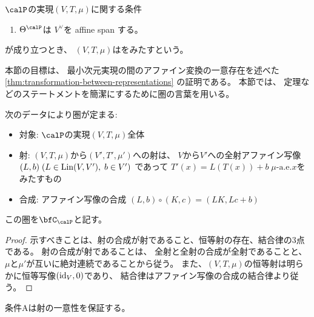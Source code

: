 \documentclass[report]{jlreq}
\begin{document}
\begin{definition}[条件B]
    $\calP$の実現$(V, T, \mu)$に関する条件
    \begin{enumerate}
        \item $\Theta^\calP$は
            $V^\vee$を affine span する。
    \end{enumerate}
    が成り立つとき、
    $(V, T, \mu)$はをみたすという。
\end{definition}

本節の目標は、
最小次元実現の間のアファイン変換の一意存在を述べた
\cref{thm:transformation-between-representations}
の証明である。
本節では、
定理などのステートメントを簡潔にするために圏の言葉を用いる。

\begin{propdef}
    次のデータにより圏が定まる:
    \begin{itemize}
        \item 対象: $\calP$の実現$(V, T, \mu)$全体
        \item 射: $(V, T, \mu)$から$(V', T', \mu')$への射は、
            $V$から$V'$への全射アファイン写像
            $(L, b) \; (L \in \operatorname{Lin}(V, V'), \; b \in V')$
            であって
            $T'(x) = L(T(x)) + b \; \text{$\mu$-a.e.$x$}$をみたすもの
        \item 合成: アファイン写像の合成
            $(L, b) \circ (K, c) = (LK, Lc + b)$
    \end{itemize}
    この圏を$\bfC_\calP$と記す。
\end{propdef}

\begin{proof}
    示すべきことは、射の合成が射であること、恒等射の存在、結合律の3点である。
    射の合成が射であることは、
    全射と全射の合成が全射であることと、
    $\mu$と$\mu'$が互いに絶対連続であることから従う。
    また、$(V, T, \mu)$の恒等射は明らかに恒等写像$(\mathrm{id}_V, 0)$であり、
    結合律はアファイン写像の合成の結合律より従う。
\end{proof}

条件Aは射の一意性を保証する。

\end{document}

